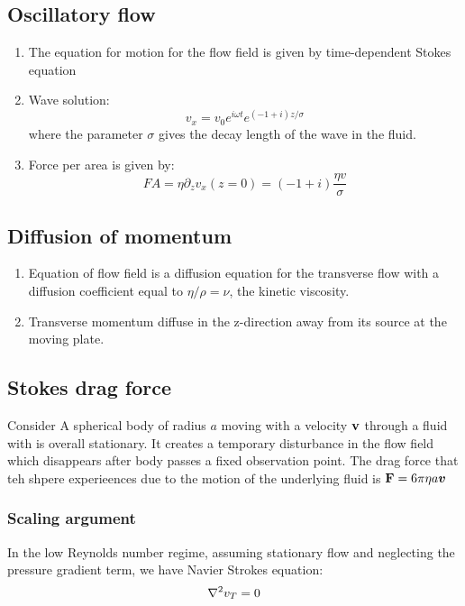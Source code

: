 \documentclass[12pt,a4paper]{article}
\begin{document}
        \subsection{Oscillatory flow}
            \begin{enumerate}
                \item The equation for motion for the flow field is given by time-dependent Stokes equation
                
                \item Wave solution:
                \begin{equation}
                    v_x = v_0 e^{i\omega t}e^{(-1+i)z/\sigma}
                \end{equation}
                where the parameter $\sigma$ gives the decay length of the wave in the fluid.
                \item Force per area is given by:
                \begin{equation}
                    FA = \eta \partial_z v_x (z=0) = (-1+i) \frac {\eta v}{\sigma}
                \end{equation}
            \end{enumerate}
        \subsection{Diffusion of momentum}
            \begin{enumerate}
                \item Equation of flow field is a diffusion equation for the transverse flow with a diffusion coefficient equal to $\eta/\rho=\nu$, the kinetic viscosity.
                \item Transverse momentum diffuse in the z-direction away from its source at the moving plate.
            \end{enumerate}    
        \subsection{Stokes drag force}
            Consider A spherical body of radius $a$ moving with a velocity $\vb{v}$ through a fluid with is overall stationary. It creates a temporary disturbance in the flow field which disappears after body passes a fixed observation point. The drag force that teh shpere experieences due to the motion of the underlying fluid is $\vb{F} = 6\pi \eta a \vb*{v}$
            \subsubsection{Scaling argument}
            In the low Reynolds number regime, assuming stationary flow and neglecting the pressure gradient term, we have Navier Strokes equation:
            \begin{equation}
                \laplacian{v_T}=0 
            \end{equation}
\end{document}
